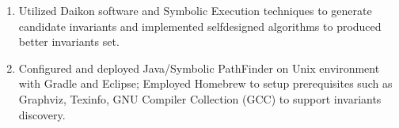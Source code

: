 \begin{enumerate}
    
        \item{
         Utilized Daikon software and Symbolic Execution techniques to generate candidate invariants and implemented selfdesigned algorithms to produced better invariants set.}  
     
         \item{Configured and deployed Java/Symbolic PathFinder on Unix environment with Gradle and Eclipse; Employed Homebrew to setup prerequisites such as Graphviz, Texinfo, GNU Compiler Collection (GCC) to support invariants discovery.}
 
 \end{enumerate}